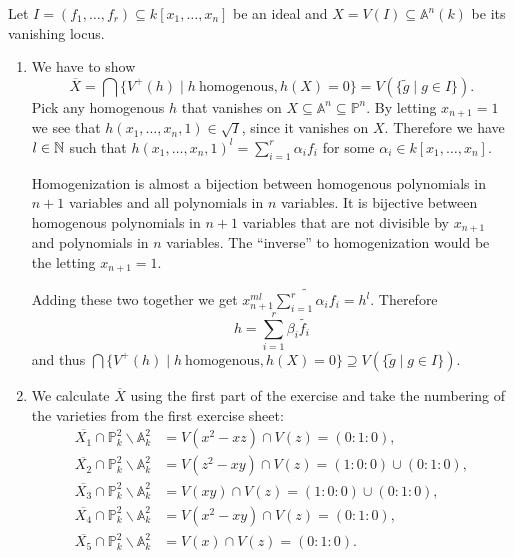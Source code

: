 \newcommand{\sheet}{2}




\maketitle

\begin{exercise}{1}
    Let $I = (f_1, \dots, f_r) \subseteq k[x_1, \dots, x_n]$ be an ideal and $X
    = V(I) \subseteq \mathbb{A}^n(k)$ be its vanishing locus.
    \begin{enumerate}
        \item{} We have to show
            \[
                \overline{X} = \bigcap \{V^+(h) \mid h\ \text{homogenous}, h(X) = 0\} =
                V(\{ \tilde{g} \mid g \in I \}).
            \]
            Pick any homogenous $h$ that vanishes on $X \subseteq \mathbb{A}^n
            \subseteq \mathbb{P}^n$. By letting $x_{n+1} = 1$ we see that
            $h(x_1, \dots, x_n, 1) \in \sqrt{I}$, since it vanishes on $X$.
            Therefore we have $l \in \mathbb{N}$ such that $h(x_1, \dots, x_n, 1)^l =
            \sum_{i = 1}^{r} \alpha_i f_i$ for some $\alpha_i \in k[x_1, \dots,
            x_n]$.

            { \color{gray} Homogenization is almost a bijection between
            homogenous polynomials in $n+1$ variables and all polynomials in $n$
            variables. It is bijective between homogenous polynomials in $n+1$
            variables 
            that are not divisible by $x_{n+1}$ and polynomials in $n$
            variables. The ``inverse'' to homogenization would be the letting
            $x_{n+1} = 1$. }

            Adding these two together we get $x^{ml}_{n+1} \widetilde{\sum_{i =
            1}^{r} \alpha_i f_i} = h^l$. Therefore
            \[
                h = \sum^r_{i = 1} \beta_i \widetilde{f_i}
            \]
            and thus $\bigcap \{V^+(h) \mid h\ \text{homogenous}, h(X) = 0\}
            \supseteq V(\{ \tilde{g} \mid g \in I \})$.

        \item{} We calculate $\overline{X}$ using the first part of the exercise and take the numbering of the
        varieties from the first exercise sheet:\\
        \begin{align*}
            \overline{X_1}\cap \mathbb{P}^2_k \backslash \mathbb{A}^2_k&=V(x^2-xz)\cap V(z)=(0:1:0),\\
            \overline{X_2}\cap \mathbb{P}^2_k \backslash \mathbb{A}^2_k&=V(z^2-xy)\cap V(z)=(1:0:0)\cup (0:1:0),\\
            \overline{X_3}\cap \mathbb{P}^2_k \backslash \mathbb{A}^2_k&=V(xy)\cap V(z)=(1:0:0)\cup (0:1:0),\\
            \overline{X_4}\cap \mathbb{P}^2_k \backslash \mathbb{A}^2_k&=V(x^2-xy)\cap V(z)=(0:1:0),\\
            \overline{X_5}\cap \mathbb{P}^2_k \backslash \mathbb{A}^2_k&=V(x)\cap V(z)=(0:1:0).
        \end{align*}


\end{enumerate}
\end{exercise}
